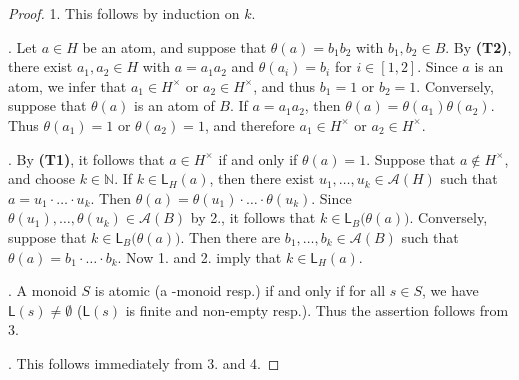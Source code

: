 \documentclass[a4paper]{amsart}
\theoremstyle{definition}
\numberwithin{equation}{section}
\begin{document}
\begin{proof}
1. This follows by induction on $k$.

. Let $a \in H$ be an atom, and suppose that $\theta (a) = b_1b_2$
with $b_1, b_2 \in B$. By {\bf (T2)}, there exist $a_1, a_2 \in H$
with $a = a_1 a_2$ and $\theta (a_i) = b_i $ for $i \in [1, 2]$.
Since $a$ is an atom, we infer that $a_1 \in H^{\times}$ or $a_2 \in H^{\times}$, and thus
$b_1=1$ or $b_2  = 1$. Conversely, suppose that $\theta (a)$ is an
atom of $B$. If $a = a_1 a_2$, then $\theta (a) = \theta (a_1)
\theta (a_2)$. Thus $\theta (a_1) =1$ or $\theta (a_2) = 1$, and
therefore $a_1 \in H^{\times}$ or $a_2 \in H^{\times}$.

. By {\bf (T1)}, it follows that $a \in H^{\times}$ if and only if $\theta (a) =
1$. Suppose that $a \notin H^{\times}$, and choose $k \in {\mathbb N}$. If $k \in \mathsf
L_H (a)$, then there exist $u_1, \ldots, u_k \in \mathcal A (H)$
such that $a = u_1 \cdot \ldots \cdot u_k$. Then $\theta (a) =
\theta (u_1) \cdot \ldots \cdot \theta (u_k)$. Since $\theta (u_1),
\ldots, \theta (u_k)  \in \mathcal A (B)$ by 2., it follows that $k
\in \mathsf L_B \big( \theta (a) \big)$. Conversely, suppose that $k
\in \mathsf L_B \big( \theta (a) \big)$. Then there are $b_1,
\ldots, b_k \in \mathcal A (B)$ such that $\theta (a) = b_1 \cdot
\ldots \cdot b_k$. Now 1. and 2.  imply that $k \in \mathsf L_H
(a)$.

. A monoid $S$ is atomic (a {}-monoid resp.) if and only if for
all $s \in S$, we have $\mathsf L (s) \ne \emptyset$ ($\mathsf L
(s)$ is finite and non-empty resp.). Thus the assertion follows from
3.

. This follows immediately from 3. and 4.
\end{proof}
\end{document}

